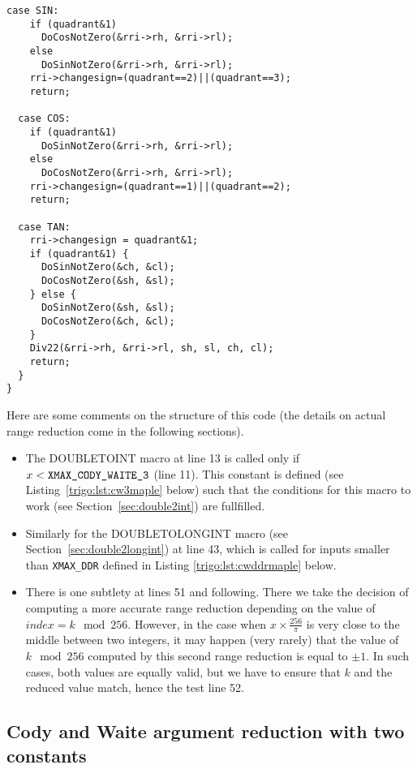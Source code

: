 \begin{lstlisting}[caption={Multilevel argument reduction},firstnumber=1]
  case SIN: 
    if (quadrant&1)   
      DoCosNotZero(&rri->rh, &rri->rl);
    else 
      DoSinNotZero(&rri->rh, &rri->rl);
    rri->changesign=(quadrant==2)||(quadrant==3);
    return;

  case COS: 
    if (quadrant&1)   
      DoSinNotZero(&rri->rh, &rri->rl);
    else 
      DoCosNotZero(&rri->rh, &rri->rl);
    rri->changesign=(quadrant==1)||(quadrant==2);
    return;

  case TAN: 
    rri->changesign = quadrant&1;
    if (quadrant&1) {
      DoSinNotZero(&ch, &cl);
      DoCosNotZero(&sh, &sl);
    } else {
      DoSinNotZero(&sh, &sl);
      DoCosNotZero(&ch, &cl);
    }
    Div22(&rri->rh, &rri->rl, sh, sl, ch, cl);
    return;
  }
}
\end{lstlisting}
 

Here are some comments on the structure of this code (the details on
actual range reduction come in the following sections).

\begin{itemize}
\item The DOUBLETOINT macro at line 13 is called only if
  $x<\verb!XMAX_CODY_WAITE_3!$ (line 11). This constant is defined  (see
  Listing~\ref{trigo:lst:cw3maple} below) such
  that the conditions for this macro to work (see
  Section~\ref{sec:double2int}) are fullfilled. 

\item Similarly for the DOUBLETOLONGINT macro (see
  Section~\ref{sec:double2longint}) at line 43, which is called for
  inputs smaller than \verb!XMAX_DDR! defined in Listing
  \ref{trigo:lst:cwddrmaple} below.

\item There is one subtlety at lines 51 and following. There we take
  the decision of computing a more accurate range reduction depending
  on the value of $\mathit{index}=k\mod 256$. However, in the case
  when $x\times\frac{256}{\pi}$ is very close to the middle between
  two integers, it may happen (very rarely) that the value of $k\mod
  256$ computed by this second range reduction is equal to $\pm 1$. In
  such cases, both values are equally valid, but we have to ensure
  that $k$ and the reduced value match, hence the test line 52.
\end{itemize}



\subsection{Cody and Waite argument reduction with two constants}


